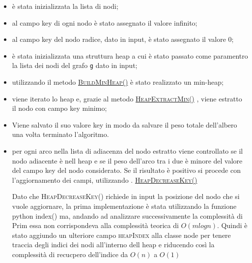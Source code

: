 \begin{itemize}
    \item è stata inizializzata la lista di nodi;
    \item al campo key di ogni nodo è stato assegnato il valore infinito;
    \item al campo key del nodo radice, dato in input, è stato assegnato il valore 0;
    \item è stata inizializzata una struttura heap a cui è stato passato come paramentro la lista dei nodi del grafo \texttt{g} dato in input;
    \item utilizzando il metodo \hyperlink{buildminheap}{\textsc{BuildMinHeap()}} è stato realizzato un min-heap;
    \item viene iterato lo heap e, grazie al metodo \hyperlink{heapextractmin}{\textsc{HeapExtractMin()}} , viene estratto il nodo con campo key minimo;
    \item Viene salvato il suo valore key in modo da salvare il peso totale dell'albero una volta terminato l'algoritmo.
    \item per ogni arco nella lista di adiacenza del nodo estratto  viene controllato se il nodo adiacente è nell heap e se il peso dell'arco tra i due è minore del valore del campo key del nodo considerato. Se il risultato è positivo si procede con l'aggiornamento dei campi, utilizzando . \hyperlink{heapdecreasekey}{\textsc{HeapDecreaseKey()}}

Dato che \textsc{HeapDecreaseKey()} richiede in input la posizione del nodo che si vuole aggiornare, la prima implementazione è stata utilizzando la funzione python index() ma, andando ad analizzare successivamente la complessità di Prim essa non corrispondeva alla complessità teorica di $O(m log{} n)$. Quindi è stato aggiundo un ulteriore campo \textsc{heapIndex} alla classe node per tenere traccia degli indici dei nodi all'interno dell heap e riducendo così la complessità di recucpero dell'indice da $O(n)$ a $O(1)$

\end{itemize}
\label{complessità}
